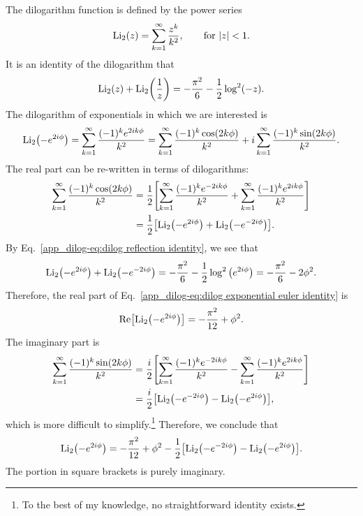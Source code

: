 \documentclass[../thesis.tex]{subfiles}
\providecommand{\Li}{\mathrm{Li}}
\providecommand{\Re}{\mathrm{Re}}
\begin{document}
	The dilogarithm function is defined by the power series \cite{andrews_hypergeometric_1999}
	\begin{equation}\label{app_dilog-eq:dilog definition}
		\Li_2(z) = \sum_{k = 1}^\infty \frac{z^k}{k^2}, \qquad \text{for } \abs{z} < 1.
	\end{equation}
	It is an identity of the dilogarithm that \cite{zagier_dilogarithm_2007}
	\begin{equation}\label{app_dilog-eq:dilog reflection identity}
		\Li_2(z) + \Li_2\qty(\frac{1}{z}) = -\frac{\pi^2}{6} - \frac{1}{2}\log^2(-z).
	\end{equation}
	The dilogarithm of exponentials in which we are interested is
	\begin{equation}\label{app_dilog-eq:dilog exponential euler identity}
		\Li_2\qty(-e^{2i\phi}) = \sum_{k = 1}^\infty \frac{(-1)^k e^{2ik \phi}}{k^2} = \sum_{k = 1}^\infty \frac{(-1)^k \cos(2k\phi)}{k^2} + i\sum_{k = 1}^\infty \frac{(-1)^k \sin(2k\phi)}{k^2}.
	\end{equation}
	The real part can be re-written in terms of dilogarithms:
	\begin{equation}
	\begin{aligned}
		\sum_{k = 1}^\infty \frac{(-1)^k \cos(2k\phi)}{k^2} &= \frac{1}{2}\qty[\sum_{k = 1}^\infty \frac{(-1)^k e^{-2ik\phi}}{k^2} + \sum_{k = 1}^\infty \frac{(-1)^k e^{2ik\phi}}{k^2}] \\
		&= \frac{1}{2}\qty[\Li_2\qty(-e^{2i\phi}) + \Li_2\qty(-e^{-2i\phi})].
	\end{aligned}
	\end{equation}
	By Eq.~\ref{app_dilog-eq:dilog reflection identity}, we see that
	\begin{equation}
		\Li_2\qty(-e^{2i\phi}) + \Li_2\qty(-e^{-2i\phi}) = -\frac{\pi^2}{6} - \frac{1}{2}\log^2\qty(e^{2i\phi}) = -\frac{\pi^2}{6} - 2\phi^2.
	\end{equation}
	Therefore, the real part of Eq.~\ref{app_dilog-eq:dilog exponential euler identity} is
	\begin{equation}
		\Re\qty[\Li_2\qty(-e^{2i\phi})] = -\frac{\pi^2}{12} + \phi^2.
	\end{equation}
	The imaginary part is
	\begin{equation}
	\begin{aligned}
		\sum_{k = 1}^\infty \frac{(-1)^k \sin(2 k \phi)}{k^2} &= \frac{i}{2}\qty[\sum_{k = 1}^\infty \frac{(-1)^k e^{-2ik\phi}}{k^2} - \sum_{k = 1}^\infty \frac{(-1)^k e^{2ik \phi}}{k^2}] \\
		&= \frac{i}{2}\qty[\Li_2\qty(-e^{-2i\phi}) - \Li_2\qty(-e^{2i\phi})],
	\end{aligned}
	\end{equation}
	which is more difficult to simplify.\footnote{To the best of my knowledge, no straightforward identity exists.} Therefore, we conclude that
	\begin{equation}\label{app_dilog-eq:dilog exponential identity}
		\Li_2\qty(-e^{2i\phi}) = -\frac{\pi^2}{12} + \phi^2 - \frac{1}{2}\qty[\Li_2\qty(-e^{-2i\phi}) - \Li_2\qty(-e^{2i\phi})].
	\end{equation}
	The portion in square brackets is purely imaginary.


%  
% 
\end{document}
